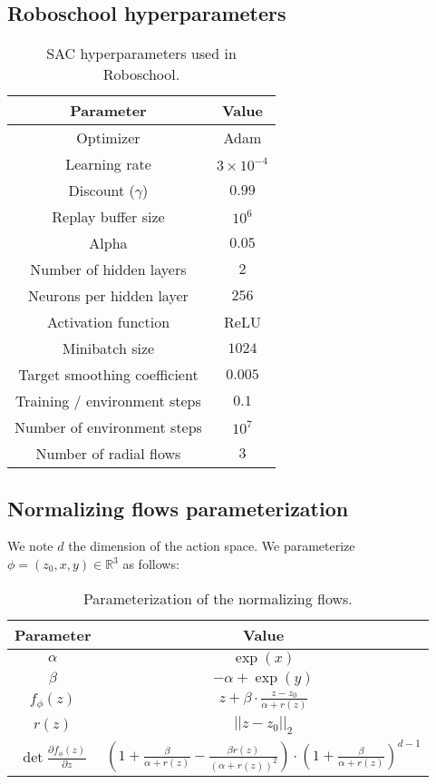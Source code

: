 \documentclass[letterpaper]{article} \usepackage{aaai20}  \usepackage{times}  \usepackage{helvet} \usepackage{courier}  \usepackage[hyphens]{url}  \usepackage{graphicx} \urlstyle{rm} \def\UrlFont{\rm}  \usepackage{graphicx}  \usepackage[section]{placeins}
\newcommand{\R}{\mathbb{R}}
\begin{document}
\subsection{Roboschool hyperparameters}

\begin{table}[!htbp]
\centering
 \begin{tabular}{c | c} 
 \hline
  Parameter & Value \\ \hline
  Optimizer & Adam \\
  Learning rate & $3 \times 10^{-4}$ \\
  Discount ($\gamma$) & $0.99$ \\
  Replay buffer size & $10^6$ \\
  Alpha & $0.05$ \\
  Number of hidden layers & $2$ \\
  Neurons per hidden layer & $256$ \\
  Activation function & ReLU \\
  Minibatch size & $1024$ \\
  Target smoothing coefficient & $0.005$ \\
  Training / environment steps& $0.1$ \\
  Number of environment steps & $10^7$ \\
  Number of radial flows & $3$ \\
  \hline
\end{tabular}
\caption{SAC hyperparameters used in Roboschool.}
\label{robochool_hyperparameters}
\end{table}

\subsection{Normalizing flows parameterization}

We note $d$ the dimension of the action space. We parameterize $\phi=(z_0, x, y) \in \R^3$ as follows:

\begin{table}[!htbp]
\centering
 \begin{tabular}{c | c} 
 \hline
 Parameter & Value\\
 \hline
  $\alpha$ & $\exp(x)$ \\ 
  \hline
  $\beta$ & $-\alpha + \exp(y)$ \\ 
  \hline
  $f_{\phi}(z)$ & $z + \beta \cdot \frac{z - z_0}{\alpha + r(z)}$ \\ 
  \hline
  $r(z)$ & $||z - z_0||_2$ \\
  \hline
  $\det \frac{\partial f_{\phi}(z)}{\partial z}$ & $\left( 1 + \frac{\beta}{\alpha + r(z)} - \frac{\beta r(z)}{(\alpha + r(z))^2} \right) \cdot \left( 1 + \frac{\beta}{\alpha + r(z)} \right)^{d - 1}$ \\ 
  \hline
\end{tabular}
\caption{Parameterization of the normalizing flows.}
\label{nflows_parameterization}
\end{table}
\end{document}
